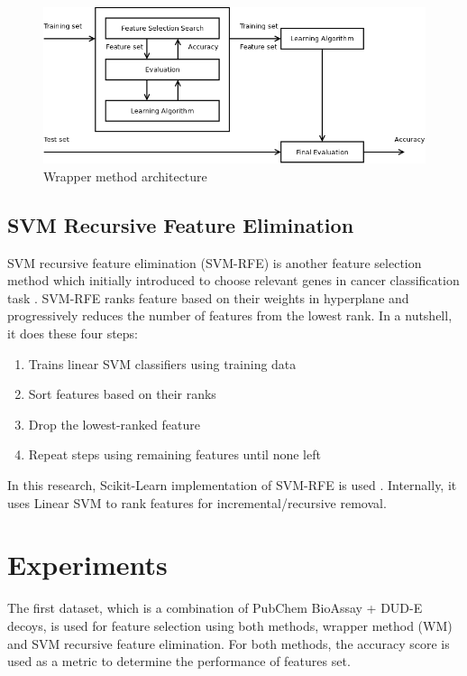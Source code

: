\documentclass[conference]{IEEEtran}
\begin{document}
\begin{figure}
	\includegraphics[scale=0.27]{../images/wrapper_method.png}
	\caption{Wrapper method architecture \cite{tang2014feature}}
	\label{fig_wrapper_method_architecture}
\end{figure}

\subsection{SVM Recursive Feature Elimination}

SVM recursive feature elimination (SVM-RFE) is another feature selection method which initially introduced to choose relevant genes in cancer classification task \cite{guyon2002gene}. SVM-RFE ranks feature based on their weights in hyperplane and progressively reduces the number of features from the lowest rank. In a nutshell, it does these four steps:

\begin{enumerate}
	\item Trains linear SVM classifiers using training data
	\item Sort features based on their ranks
	\item Drop the lowest-ranked feature
	\item Repeat steps using remaining features until none left
\end{enumerate}

In this research, Scikit-Learn implementation of SVM-RFE is used \cite{pedregosa2011scikit}. Internally, it uses Linear SVM to rank features for incremental/recursive removal.

\section{Experiments} \label{Experiments}

The first dataset, which is a combination of PubChem BioAssay + DUD-E decoys, is used for feature selection using both methods, wrapper method (WM) and SVM recursive feature elimination. For both methods, the accuracy score is used as a metric to determine the performance of features set. 
\end{document}
